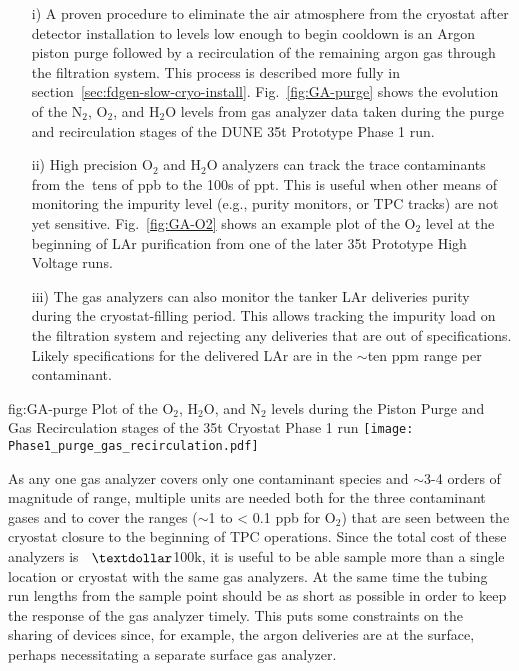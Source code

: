 \begin{enumerate}
\item[i)] A proven procedure to eliminate the air atmosphere from the cryostat after detector installation to levels low enough to begin cooldown is an Argon piston purge followed by a recirculation of the remaining argon gas through the filtration system. This process is described more fully in section~\ref{sec:fdgen-slow-cryo-install}. Fig.~\ref{fig:GA-purge} shows the evolution of the $\text{N}_2$, $\text{O}_2$, and $\text{H}_2\text{O}$ levels from gas analyzer data taken during the purge and recirculation stages of the DUNE \num{35}\si{t} Prototype Phase 1 run.

\item[ii)] High precision $\text{O}_2$ and $\text{H}_2\text{O}$ analyzers can track the trace contaminants from the $\>$tens of ppb to the 100s of ppt. This is useful when other means of monitoring the impurity level (e.g., purity monitors, or TPC tracks) are not yet sensitive. Fig.~\ref{fig:GA-O2} shows an example plot of the $\text{O}_2$ level at the beginning of LAr purification from one of the later \num{35}\si{t} Prototype High Voltage runs.

\item[iii)] The gas analyzers can also monitor the tanker LAr deliveries purity during the cryostat-filling period. This allows tracking the impurity load on the filtration system and rejecting any deliveries that are out of specifications. Likely specifications for the delivered LAr are in the $\sim$ten ppm range per contaminant.

\end{enumerate}

\begin{dunefigure}{fig:GA-purge}
  {Plot of the $\text{O}_2$, $\text{H}_2\text{O}$, and $\text{N}_2$ levels during the Piston Purge and Gas Recirculation stages of the \num{35}\si{t} Cryostat Phase 1 run}
  \texttt{[image: Phase1\_purge\_gas\_recirculation.pdf]}%
\end{dunefigure}

As any one gas analyzer covers only one contaminant species and $\sim$3-4 orders of magnitude of range, multiple units are needed both for the three contaminant gases and to cover the ranges ($\sim$1 to < 0.1 ppb for $\text{O}_2$) that are seen between the cryostat closure to the beginning of TPC operations. Since the total cost of these analyzers is $\>$ $\textdollar$100k, it is useful to be able sample more than a single location or cryostat with the same gas analyzers. At the same time the tubing run lengths from the sample point should be as short as possible in order to keep the response of the gas analyzer timely. This puts some constraints on the sharing of devices since, for example, the argon deliveries are at the surface, perhaps necessitating a separate surface gas analyzer.

